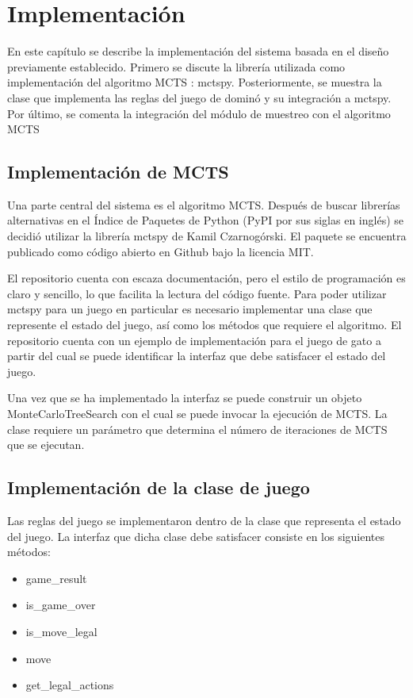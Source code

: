 \chapter{Implementación}

\noindent

En este capítulo se describe la implementación del sistema basada en el diseño previamente 
establecido. Primero se discute la librería utilizada como implementación del algoritmo 
MCTS : mctspy. Posteriormente, se muestra la clase que implementa las reglas del juego de 
dominó y su integración a mctspy. Por último, se comenta la integración del módulo de 
muestreo con el algoritmo MCTS

\section{Implementación de MCTS}

Una parte central del sistema es el algoritmo MCTS. Después de buscar librerías 
alternativas en el Índice de Paquetes de Python (PyPI por sus siglas en inglés) se decidió 
utilizar la librería mctspy de Kamil Czarnogórski. El paquete se encuentra publicado como 
código abierto en Github bajo la licencia MIT. 

El repositorio cuenta con escaza documentación, pero el estilo de programación es claro y 
sencillo, lo que facilita la lectura del código fuente. Para poder utilizar mctspy para un 
juego en particular es necesario implementar una clase que represente el estado del juego, 
así como los métodos que requiere el algoritmo. El repositorio cuenta con un ejemplo de 
implementación para el juego de gato a partir del cual se puede identificar la interfaz que 
debe satisfacer el estado del juego.

Una vez que se ha implementado la interfaz se puede construir un objeto 
MonteCarloTreeSearch con el cual se puede invocar la ejecución de MCTS. La clase 
requiere un parámetro que determina el número de iteraciones de MCTS que se ejecutan.

\section{Implementación de la clase de juego}

Las reglas del juego se implementaron dentro de la clase que representa el estado del juego. 
La interfaz que dicha clase debe satisfacer consiste en los siguientes métodos:

\begin{itemize}
   \item game\_result
   \item is\_game\_over
   \item is\_move\_legal
   \item move
   \item get\_legal\_actions
\end{itemize}

